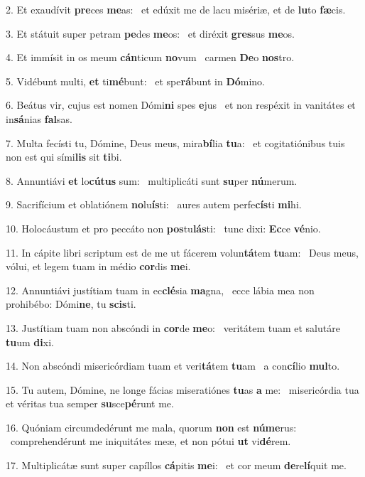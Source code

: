2. Et exaudívit \textbf{pre}ces \textbf{me}as: \ast\  et edúxit me de lacu misériæ, et de \textbf{lu}to \textbf{fæ}cis.\

3. Et státuit super petram \textbf{pe}des \textbf{me}os: \ast\  et diréxit \textbf{gres}sus \textbf{me}os.\

4. Et immísit in os meum \textbf{cán}ticum \textbf{no}vum \ast\  carmen \textbf{De}o \textbf{nos}tro.\

5. Vidébunt multi, \textbf{et} ti\textbf{mé}bunt: \ast\  et spe\textbf{rá}bunt in \textbf{Dó}mino.\

6. Beátus vir, cujus est nomen Dómi\textbf{ni} spes \textbf{e}jus \ast\  et non respéxit in vanitátes et in\textbf{sá}nias \textbf{fal}sas.\

7. Multa fecísti tu, Dómine, Deus meus, mira\textbf{bí}lia \textbf{tu}a: \ast\  et cogitatiónibus tuis non est qui sími\textbf{lis} sit \textbf{ti}bi.\

8. Annuntiávi \textbf{et} lo\textbf{cú}\textbf{tus} sum: \ast\  multiplicáti sunt \textbf{su}per \textbf{nú}merum.\

9. Sacrifícium et oblatiónem \textbf{no}lu\textbf{ís}ti: \ast\  aures autem perfe\textbf{cís}ti \textbf{mi}hi.\

10. Holocáustum et pro peccáto non \textbf{pos}tu\textbf{lás}ti: \ast\  tunc dixi: \textbf{Ec}ce \textbf{vé}nio.\

11. In cápite libri scriptum est de me ut fácerem volun\textbf{tá}tem \textbf{tu}am: \ast\  Deus meus, vólui, et legem tuam in médio \textbf{cor}dis \textbf{me}i.\

12. Annuntiávi justítiam tuam in ec\textbf{clé}sia \textbf{ma}gna, \ast\  ecce lábia mea non prohibébo: Dómi\textbf{ne}, tu \textbf{scis}ti.\

13. Justítiam tuam non abscóndi in \textbf{cor}de \textbf{me}o: \ast\  veritátem tuam et salutáre \textbf{tu}um \textbf{di}xi.\

14. Non abscóndi misericórdiam tuam et veri\textbf{tá}tem \textbf{tu}am \ast\  a con\textbf{cí}lio \textbf{mul}to.\

15. Tu autem, Dómine, ne longe fácias miseratiónes \textbf{tu}as \textbf{a} me: \ast\  misericórdia tua et véritas tua semper \textbf{su}sce\textbf{pé}runt me.\

16. Quóniam circumdedérunt me mala, quorum \textbf{non} est \textbf{nú}\textbf{me}rus: \ast\  comprehendérunt me iniquitátes meæ, et non pótui \textbf{ut} vi\textbf{dé}rem.\

17. Multiplicátæ sunt super capíllos \textbf{cá}pitis \textbf{me}i: \ast\  et cor meum \textbf{de}re\textbf{lí}quit me.\

